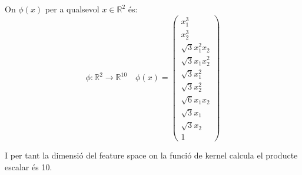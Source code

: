\documentclass[a4paper]{article}
\begin{document}
On $\phi(x)$ per a qualsevol $x \in \mathbb{R}^2$ és:
$$
\phi: \mathbb{R}^2 \rightarrow \mathbb{R}^{10}
\quad
\phi(x)  =\begin{pmatrix}
x_1^3 \\
x_2^3 \\
\sqrt{3}x_1^2x_2 \\
\sqrt{3}x_1x_2^2 \\
\sqrt{3}x_1^2 \\
\sqrt{3}x_2^2 \\
\sqrt{6} x_1x_2\\
\sqrt{3}x_1\\
\sqrt{3}x_2\\
1
\end{pmatrix}
$$

I per tant la dimensió del feature space on la funció de kernel calcula el producte escalar és 10.
\end{document}
